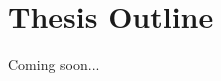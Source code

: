 \begin{comment}
ICP is robust for larger degrees, but the number of boxes (products of intervals) to explore 
exponentially explodes when variables increase. 
Thus, design of strategies for selecting variables to decompose and boxes to explore is crucial 
for efficiency. Our strategy design is, 
\begin{itemize}
\item a box with more possiblity to be SAT is selected to explore, which is estimated by 
several heuristic measures, called {\em SAT likelyhood}, 
and the number of unsolved atomic polynomial constraints, and
\item a more influential variable is selected for multiple test cases and decomposition, 
which is estimated by {\em sensitivity}. 
\end{itemize} 
Note that {\em SAT likelyhood} and {\em sensitivity} are estimated during interval arithmetic. 
Especially, the latter can be applied only with Affine intervals. 
{\bf raSAT} also applies incremental search, which is often faster in practice. 
\begin{itemize}
\item {\bf Incremental widening}. 
Starting {\bf raSAT} loop with a smaller interval, and if it is UNSAT, enlarge the input intervals
and restart. 
\item {\bf Incremental deepening}. 
Starting with the bound that each interval will be decomposed no smaller than it. 
If neither SAT nor UNSAT is detected, take a smaller bound and restart. 
\end{itemize} 
Efficient UNSAT core and UNSAT confirmation %
are left for future work. 

They are compared on Zankl and Meti-Tarski benchmarks from 
QF\_NRA category of SMT-LIB\footnote{\tt http://www.smtlib.org/}. 
They are also evaluated by comparing 
{\bf Z3 4.3}\footnote{\tt http://z3.codeplex.com} and {\bf iSAT3}. 
Another advantage of {\bf raSAT} is the ease to handle mixed intergers, 
and experiments on AProVE benchmark from QF\_NIA category of SMT-LIB compares {\bf raSAT} with 
{\bf Z3 4.3}. 
Although {\bf Z3 4.3} performs the best, {\bf raSAT} shows comparable SAT detection on 
very large problems (e.g., with several hundred variables) with the combination of 
{\em SAT likelyhood} and {\em sensitivity}. 


\medskip 
{\bf raSAT} applies SAT confirmation to avoid soundness errors caused by roundoff/overflow errors. 
Another static analysis based approach is found in~\cite{SilvaTACAS12}. 
\end{comment}

\section{Thesis Outline}
Coming soon...